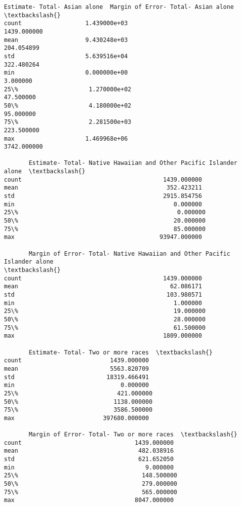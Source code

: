 \documentclass[11pt]{article}
\begin{document}
\begin{tcolorbox}[breakable, size=fbox, boxrule=.5pt, pad at break*=1mm, opacityfill=0]
\begin{Verbatim}[commandchars=\\\{\}]
       Estimate- Total- Asian alone  Margin of Error- Total- Asian alone  \textbackslash{}
count                  1.439000e+03                          1439.000000
mean                   9.430248e+03                           204.054899
std                    5.639516e+04                           322.480264
min                    0.000000e+00                             3.000000
25\%                    1.270000e+02                            47.500000
50\%                    4.180000e+02                            95.000000
75\%                    2.281500e+03                           223.500000
max                    1.469968e+06                          3742.000000

       Estimate- Total- Native Hawaiian and Other Pacific Islander alone  \textbackslash{}
count                                        1439.000000
mean                                          352.423211
std                                          2915.854756
min                                             0.000000
25\%                                             0.000000
50\%                                            20.000000
75\%                                            85.000000
max                                         93947.000000

       Margin of Error- Total- Native Hawaiian and Other Pacific Islander alone
\textbackslash{}
count                                        1439.000000
mean                                           62.086171
std                                           103.980571
min                                             1.000000
25\%                                            19.000000
50\%                                            28.000000
75\%                                            61.500000
max                                          1809.000000

       Estimate- Total- Two or more races  \textbackslash{}
count                         1439.000000
mean                          5563.820709
std                          18319.466491
min                              0.000000
25\%                            421.000000
50\%                           1138.000000
75\%                           3586.500000
max                         397680.000000

       Margin of Error- Total- Two or more races  \textbackslash{}
count                                1439.000000
mean                                  482.038916
std                                   621.652050
min                                     9.000000
25\%                                   148.500000
50\%                                   279.000000
75\%                                   565.000000
max                                  8047.000000


\end{Verbatim}
\end{tcolorbox}
\end{document}
